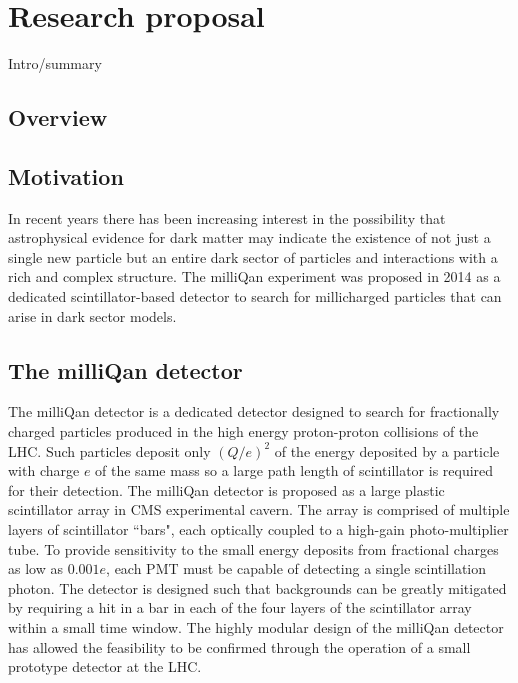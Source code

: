 \documentclass[11pt]{article}
\theoremstyle{plain} \numberwithin{equation}{section}
\theoremstyle{definition}
\begin{document}
\section*{Research proposal}
\noindent 

Intro/summary
\subsection*{Overview}

\subsection*{Motivation}

In recent years there has been increasing interest in the possibility 
that astrophysical evidence for dark matter may indicate the existence 
of not just a single new particle but an entire dark sector
of particles and interactions with a rich and complex structure. The milliQan experiment 
was proposed in 2014 as a dedicated scintillator-based detector to search 
for millicharged particles that can arise in dark sector models. 


\subsection*{The milliQan detector}

The milliQan detector is a dedicated detector 
designed to search for fractionally 
charged particles produced in the high energy proton-proton collisions of the LHC. 
Such particles deposit only $(Q/e)^2$ of the energy 
deposited by a particle with charge $e$ of
the same mass so a large path length of scintillator is required for
their detection. The milliQan detector is proposed as a large plastic
scintillator array in CMS experimental cavern. The array is comprised of multiple layers
of scintillator ``bars", each optically coupled to a high-gain photo-multiplier tube.
To provide sensitivity to the small energy deposits from fractional charges as low as $0.001 e$, 
each PMT must be capable of detecting a single scintillation photon. 
The detector is designed such that backgrounds can be greatly mitigated
by requiring a hit in a bar in each of the four layers 
of the scintillator array within a small time 
window. The highly modular design of the milliQan detector 
has allowed the feasibility to be confirmed through the operation 
of a small prototype detector at the LHC.
\end{document}
